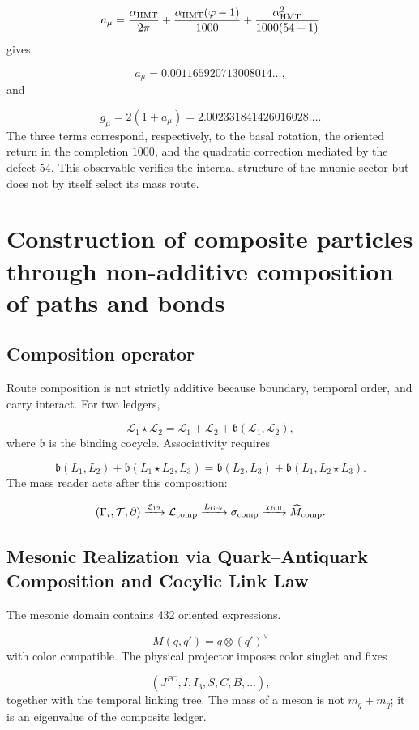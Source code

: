 \[
 a_\mu=
 \frac{\alpha_{\rm HMT}}{2\pi}
 +\frac{\alpha_{\rm HMT}(\varphi-1)}{1000}
 +\frac{\alpha_{\rm HMT}^2}{1000(54+1)}
\]
gives

\[
 a_\mu=0.001165920713008014\ldots,
\]
and

\[
 g_\mu=2(1+a_\mu)
 =2.002331841426016028\ldots.
\]
The three terms correspond, respectively, to the basal rotation, the oriented return in the completion \(1000\), and the quadratic correction mediated by the defect \(54\). This observable verifies the internal structure of the muonic sector but does not by itself select its mass route.

\section{Construction of composite particles through non-additive composition of paths and bonds}
\subsection{Composition operator}
Route composition is not strictly additive because boundary, temporal order, and carry interact. For two ledgers,

\[
 \mathcal L_1\star\mathcal L_2
 =\mathcal L_1+\mathcal L_2
 +\mathfrak b(\mathcal L_1,\mathcal L_2),
\]
where \(\mathfrak b\) is the binding cocycle. Associativity requires

\[
 \mathfrak b(L_1,L_2)
 +\mathfrak b(L_1\star L_2,L_3)
 =
 \mathfrak b(L_2,L_3)
 +\mathfrak b(L_1,L_2\star L_3).
\]
The mass reader acts after this composition:

\[
 (\Gamma_i,\mathcal T,\partial)
 \xrightarrow{\mathfrak C_{12}}
 \mathcal L_{\rm comp}
 \xrightarrow{L_{\rm tick}}
 \sigma_{\rm comp}
 \xrightarrow{\chi_{\rm full}}
 \widehat M_{\rm comp}.
\]
\subsection{Mesonic Realization via Quark–Antiquark Composition and Cocylic Link Law}
The mesonic domain contains 432 oriented expressions.

\[
 M(q,q')=q\otimes(q')^\vee
\]
with color compatible. The physical projector imposes color singlet and fixes

\[
 (J^{PC},I,I_3,S,C,B,\ldots),
\]
together with the temporal linking tree. The mass of a meson is not \(m_q+m_{\bar q}\); it is an eigenvalue of the composite ledger.

